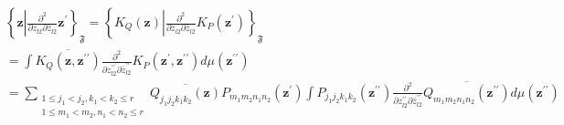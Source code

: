 \documentclass[aps,preprint]{revtex4}%
\begin{document}
\bigskip%

\begin{align}
&  \left\{  \mathbf{z}\left\vert \frac{\partial^{2}}{\partial z_{l2}%
\partial\bar{z}_{l2}}\mathbf{z}^{\prime}\right.  \right\}  _{\mathfrak{F}%
}=\left\{  K_{Q}\left(  \mathbf{z}\right)  \left\vert \frac{\partial^{2}%
}{\partial z_{l2}\partial\bar{z}_{l2}}K_{P}\left(  \mathbf{z}^{\prime}\right)
\right.  \right\}  _{\mathfrak{F}}\\
&  =\int\overline{K_{Q}\left(  \mathbf{z},\mathbf{z}^{\prime\prime}\right)
}\frac{\partial^{2}}{\partial z_{l2}^{\prime\prime}\partial\bar{z}%
_{l2}^{\prime\prime}}K_{P}\left(  \mathbf{z}^{\prime},\mathbf{z}^{\prime
\prime}\right)  d\mu\left(  \mathbf{z}^{\prime\prime}\right) \\
&  =\sum_{\substack{1\leq j_{1}<j_{2},k_{1}<k_{2}\leq r\\1\leq m_{1}%
<m_{2},n_{1}<n_{2}\leq r}}\overline{Q_{j_{1}j_{2}k_{1}k_{2}}\left(
\mathbf{z}\right)  }P_{m_{1}m_{2}n_{1}n_{2}}\left(  \mathbf{z}^{\prime
}\right)  \int P_{j_{1}j_{2}k_{1}k_{2}}\left(  \mathbf{z}^{\prime\prime
}\right)  \frac{\partial^{2}}{\partial z_{l2}^{\prime\prime}\partial\bar
{z}_{l2}^{\prime\prime}}\overline{Q_{m_{1}m_{2}n_{1}n_{2}}\left(
\mathbf{z}^{\prime\prime}\right)  }d\mu\left(  \mathbf{z}^{\prime\prime
}\right)
\end{align}


\bigskip%
\end{document}
